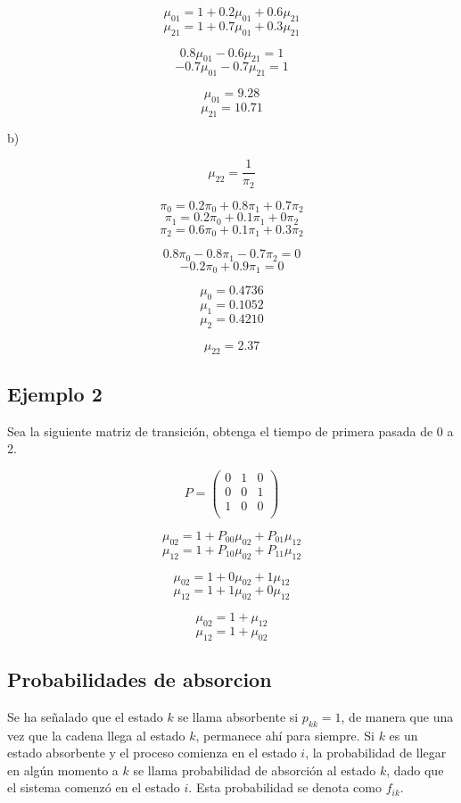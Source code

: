 \documentclass{article}
\begin{document}
\[\mu_{01} = 1 + 0.2\mu_{01} + 0.6\mu_{21}\]
\[\mu_{21} = 1 + 0.7\mu_{01} + 0.3\mu_{21}\]

\[0.8\mu_{01} - 0.6\mu_{21} = 1\]
\[-0.7\mu_{01} - 0.7\mu_{21} = 1\]

\[\mu_{01} = 9.28\]
\[\mu_{21} = 10.71\]

b)

\[\mu_{22} = \frac{1}{\pi_2}\]

\[\pi_{0} = 0.2\pi_{0} + 0.8\pi_{1} + 0.7\pi_{2}\]
\[\pi_{1} = 0.2\pi_{0} + 0.1\pi_{1} + 0\pi_{2}\]
\[\pi_{2} = 0.6\pi_{0} + 0.1\pi_{1} + 0.3\pi_{2}\]

\[0.8\pi_0 - 0.8\pi_1 -0.7\pi_2 = 0\]
\[-0.2\pi_0 + 0.9\pi_1 = 0\]

\[\mu_0 = 0.4736\]
\[\mu_1 = 0.1052\]
\[\mu_2 = 0.4210\]

\[\mu_{22} = 2.37\]

\subsection*{Ejemplo 2}

Sea la siguiente matriz de transición, obtenga el tiempo de primera pasada de 0 a 2.

\[
    P = \begin{pmatrix}
        0 & 1 & 0 \\
        0 & 0 & 1 \\
        1 & 0 & 0 \\
    \end{pmatrix}
\]

\[\mu_{02} = 1 + P_{00}\mu_{02} + P_{01}\mu_{12}\]
\[\mu_{12} = 1 + P_{10}\mu_{02} + P_{11}\mu_{12}\]

\[\mu_{02} = 1 + 0\mu_{02} + 1\mu_{12}\]
\[\mu_{12} = 1 + 1\mu_{02} + 0\mu_{12}\]

\[\mu_{02} = 1 + \mu_{12}\]
\[\mu_{12} = 1 + \mu_{02}\]

\subsection{Probabilidades de absorcion}

Se ha señalado que el estado $k$ se llama absorbente si $p_{kk} = 1$, de manera que una vez que la cadena llega al estado $k$, permanece ahí para siempre. Si $k$ es un estado absorbente y el proceso comienza en el estado $i$, la probabilidad de llegar en algún momento a $k$ se llama probabilidad de absorción al estado $k$, dado que el sistema comenzó en el estado $i$. Esta probabilidad se denota como $f_{ik}$.
\end{document}
